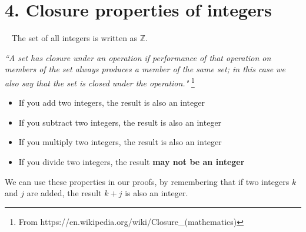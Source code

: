 \documentclass[a4paper,12pt]{book}
\begin{document}
    \newpage

    \section*{4. Closure properties of integers}

        \begin{intro}{\ }
            The set of all integers is written as $\mathbb{Z}$.

            \begin{center}
                \textit{``A set has closure under an operation if
                performance of that operation on members of the set
                always produces a member of the same set; in this
                case we also say that the set is closed under the operation."}
                \footnote{From https://en.wikipedia.org/wiki/Closure\_(mathematics)}
            \end{center}

            \begin{itemize}
                \item   If you add two integers, the result is also an integer
                \item   If you subtract two integers, the result is also an integer
                \item   If you multiply two integers, the result is also an integer
                \item   If you divide two integers, the result \textbf{may not be an integer}
            \end{itemize}

            We can use these properties in our proofs, by remembering that
            if two integers $k$ and $j$ are added, the result $k+j$ is also an integer.
        \end{intro}
\end{document}
